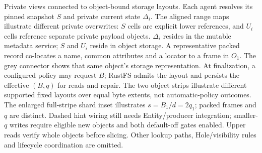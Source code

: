 \caption{Private views connected to object-bound storage layouts.
Each agent resolves its pinned snapshot $S$ and private current state
$\Delta_i$. The aligned range maps illustrate different private overwrites:
$S$ cells are explicit lower references, and $U_i$ cells reference separate
private payload objects. $\Delta_i$ resides in the mutable metadata service;
$S$ and $U_i$ reside in object storage. A representative packed record
co-locates a name, common attributes and a locator to a frame in $O_1$.
The grey connector shows that same object's storage representation.
At finalization, a configured policy may request $B$; RustFS admits the layout
and persists the effective $(B,q)$ for reads and repair. The two object
strips illustrate different supported fixed layouts over equal byte extents,
not automatic-policy outcomes. The enlarged full-stripe shard inset illustrates
$s=B_1/d=2q_1$; packed frames and $q$ are distinct.
Dashed hint wiring still needs Entity/producer integration; smaller-$q$
writes require eligible new objects and both default-off gates enabled.
Upper reads verify whole objects before slicing. Other lookup paths,
Hole/visibility rules and lifecycle coordination are omitted.}
